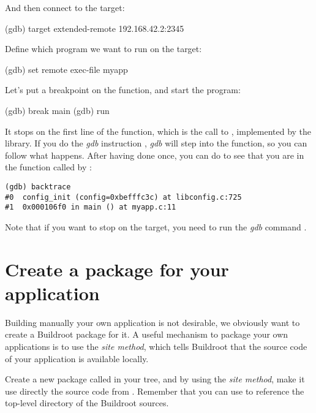 And then connect to the target:

\begin{bashinput}
(gdb) target extended-remote 192.168.42.2:2345
\end{bashinput}

Define which program we want to run on the target:

\begin{bashinput}
(gdb) set remote exec-file myapp
\end{bashinput}

Let's put a breakpoint on the  function, and start the
program:

\begin{bashinput}
(gdb) break main
(gdb) run
\end{bashinput}

It stops on the first line of the  function, which is the
call to , implemented by the 
library. If you do the {\em gdb} instruction , {\em gdb}
will step into the function, so you can follow what happens. After
having done  once, you can do  to see that
you are in the function  called by :

\begin{verbatim}
(gdb) backtrace
#0  config_init (config=0xbefffc3c) at libconfig.c:725
#1  0x000106f0 in main () at myapp.c:11
\end{verbatim}

Note that if you want  to stop on the target, you need
to run the {\em gdb} command .

\section{Create a package for your application}

Building manually your own application is not desirable, we obviously
want to create a Buildroot package for it. A useful mechanism to
package your own applications is to use the
 {\em site method}, which tells Buildroot that the source
code of your application is available locally.

Create a new package called  in your 
tree, and by using the  {\em site method}, make it use
directly the  source code from
. Remember that you can use 
to reference the top-level directory of the Buildroot sources.


